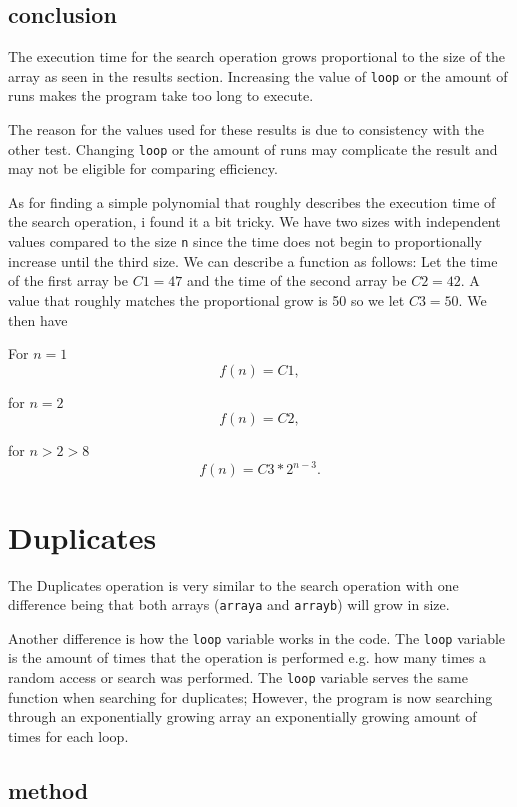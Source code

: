 \documentclass[a4paper,11pt]{article}
\begin{document}
\subsection*{conclusion}

The execution time for the search operation grows proportional to the
size of the array as seen in the results section. Increasing the value
of {\tt loop} or the amount of runs makes the program take too long to
execute. 

The reason for the values used for these results is due to consistency
with the other test. Changing {\tt loop} or the amount of runs may 
complicate the result and may not be eligible for comparing efficiency.

As for finding a simple polynomial that roughly describes the execution
time of the search operation, i found it a bit tricky. We have two sizes
with independent values compared to the size {\tt n} since the time
does not begin to proportionally increase until the third size. We can
describe a function as follows: Let the time of the first array be 
$C1 = 47$ and the time of the second array be $C2 = 42$. A value that
roughly matches the proportional grow is 50 so we let $C3 = 50$. We then
have

For $n = 1$ 
$$f(n) = C1,$$

for $n = 2$
$$f(n) = C2,$$

for $n > 2 > 8$
$$f(n) = C3*2^{n-3}.$$

\section*{Duplicates}

The Duplicates operation is very similar to the search operation with
one difference being that both arrays ({\tt array\textunderscore a}
and {\tt array\textunderscore b}) will grow in size. 

Another difference is how the {\tt loop} variable works in the code. The
{\tt loop} variable is the amount of times that the operation is 
performed e.g. how many times a random access or search was performed.
The {\tt loop} variable serves the same function when searching for
duplicates; However, the program is now searching through an
exponentially growing array an exponentially growing amount of times for
each loop. 

\subsection*{method}
\end{document}
